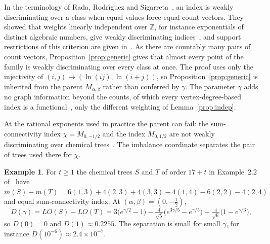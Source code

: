 \documentclass[a5paper, 10pt]{article}
\theoremstyle{plain}
\theoremstyle{remark}
\theoremstyle{definition}
\newtheorem{example}{Example}
\begin{document}
  In the terminology of Rada, Rodr\'{\i}guez and Sigarreta~\cite{RadaRodriguezSigarreta2022Weak}, an index is weakly discriminating over a class when equal values force equal count vectors. They showed that weights linearly independent over $\mathbb{Z}$, for instance exponentials of distinct algebraic numbers, give weakly discriminating indices~\cite[Theorems~3.1 and~3.8]{RadaRodriguezSigarreta2022Weak}, and support restrictions of this criterion are given in~\cite[Theorem~3, Corollary~2]{Rada2026LinearVDB}. As there are countably many pairs of count vectors, Proposition~\ref{prop:generic} gives that almost every point of the family is weakly discriminating over every class at once. The proof uses only the injectivity of $(i,j) \mapsto (\ln(ij), \ln(i+j))$, so Proposition~\ref{prop:generic} is inherited from the parent $M_{\alpha,\beta}$ rather than conferred by $\gamma$. The parameter $\gamma$ adds no graph information beyond the counts, of which every vertex-degree-based index is a functional~\cite{Rada2026LinearVDB}, only the different weighting of Lemma~\ref{prop:indep}.

  At the rational exponents used in practice the parent can fail: the sum-connectivity index $\chi = M_{0,-1/2}$ and the index $M_{0,1/2}$ are not weakly discriminating over chemical trees~\cite[Example~2.2]{RadaRodriguezSigarreta2022Weak}. The imbalance coordinate separates the pair of trees used there for $\chi$.

  \begin{example}\label{ex:sumconn}
  For $t \ge 1$ the chemical trees $S$ and $T$ of order $17 + t$ in
  Example~2.2 of~\cite{RadaRodriguezSigarreta2022Weak} have
  $m(S) - m(T) = 6(1,3) + 4(2,3) + 4(3,3) - 4(1,4) - 6(2,2) - 4(2,4)$ and
  equal sum-connectivity index. At $(\alpha,\beta) = (0,-\tfrac12)$,
  \[
  D(\gamma) = LO(S) - LO(T) = 3\bigl(e^{\gamma/2} - 1\bigr)
  - \tfrac{4}{\sqrt5}\bigl(e^{3\gamma/5} - e^{\gamma/5}\bigr)
  + \tfrac{4}{\sqrt6}\bigl(1 - e^{\gamma/3}\bigr),
  \]
  so $D(0) = 0$ and $D(1) \approx 0.2255$. The separation is small for
  small $\gamma$, for instance $D(10^{-6}) \approx 2.4 \times 10^{-7}$.
  \end{example}
\end{document}
